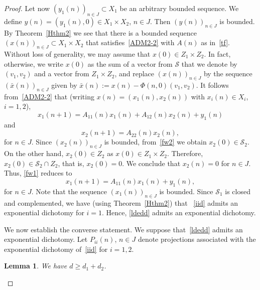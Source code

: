 \documentclass[11pt,reqno,a4paper]{amsart}
\theoremstyle{plain}
\numberwithin{equation}{section}
\newtheorem{lemma}{Lemma}
\theoremstyle{remark}
\begin{document}
\begin{proof}
    Let now $ (y_1(n))_{n\in J}\subset X_1$ be an arbitrary bounded sequence. We define $y(n)=(y_1(n),0)\in X_1\times X_2$, $n \in J$. Then $(y(n))_{n\in J}$ is bounded. By Theorem~\ref{Hthm2} we see that there is a bounded sequence $(x(n))_{n\in J}\subset X_1\times X_2$ that satisfies~\eqref{ADM2-2} with $A(n)$ as in~\eqref{tf}. Without loss of generality, we may assume that $x(0)\in Z_1\times Z_2$. In fact, otherwise, we write $x(0)$ as the sum of a vector from $\mathcal S$ that we denote by $(v_1, v_2)$ and a vector from $Z_1\times Z_2$, and replace $(x(n))_{n\in J}$ by the sequence $(\bar x(n))_{n\in J}$ given by $\bar x(n):=x(n)-\Phi(n, 0)(v_1, v_2)$. It follows from~\eqref{ADM2-2} that (writing $x(n)=(x_1(n), x_2(n))$ with $x_i(n)\in X_i$, $i=1, 2$),
   \begin{equation}\label{fw1}x_1(n+1)=A_{11}(n) x_1(n) + A_{12}(n) x_2(n) + y_1(n) \end{equation}
   and \begin{equation}\label{fw2} x_2(n+1)=A_{22}(n) x_2(n),\end{equation} for $n \in J$. 
   Since $(x_2(n))_{n\in J}$ is bounded, from~\eqref{fw2} we obtain $x_2(0)\in \mathcal S_2$. On the other hand, $x_2(0)\in Z_2$ as $x(0)\in Z_1\times Z_2$. Therefore, $x_2(0)\in \mathcal S_2\cap Z_2$, that is, $x_2(0)=0$.  We conclude that $x_2(n)=0$ for $n \in J$. Thus, \eqref{fw1} reduces to \begin{equation}\label{reduction}x_1(n+1)=A_{11}(n)x_1(n)+y_1(n), \end{equation}
   for $n\in J$.  Note that the sequence $(x_1(n))_{n\in J}$ is bounded.
   Since $\mathcal S_1$ is closed and complemented, we have (using Theorem~\ref{Hthm2}) that ~\eqref{iid} admits an exponential dichotomy for $i=1$. Hence, \eqref{ldedd} admits an exponential dichotomy.

   We now establish the converse statement. We suppose that~\eqref{ldedd} admits an exponential dichotomy. Let $P_{ii}(n)$, $n\in J$ denote projections associated with the exponential dichotomy of~\eqref{iid} for $i=1, 2$.
\begin{lemma}\label{ddd}
We have $d\ge d_1+d_2$.
\end{lemma}


\end{proof}
\end{document}
